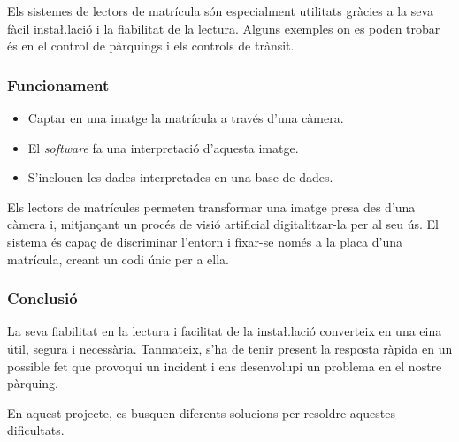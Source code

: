 Els sistemes de lectors de matrícula són
especialment utilitats gràcies a la seva fàcil insta\l.lació i la fiabilitat de
la lectura. Alguns exemples on es poden trobar és en el control de pàrquings i
els controls de trànsit.

\subsubsection{Funcionament}

\begin{itemize}
    \item Captar en una imatge la matrícula a través d'una càmera.
    \item El \emph{software} fa una interpretació d'aquesta imatge.
    \item S'inclouen les dades interpretades en una base de dades.
\end{itemize}

Els lectors de matrícules permeten transformar una imatge presa
des d'una càmera i, mitjançant un procés de visió artificial
digitalitzar-la per al seu ús. El sistema és capaç de discriminar l'entorn i
fixar-se només a la placa d'una matrícula, creant un codi únic
per a ella.

\subsubsection{Conclusió}

La seva fiabilitat en la lectura i facilitat de la insta\l.lació
converteix en una eina útil, segura i necessària. Tanmateix, s'ha de tenir present
la resposta ràpida en un possible fet que provoqui un incident i ens desenvolupi un
problema en el nostre pàrquing.

En aquest projecte, es busquen diferents solucions per resoldre aquestes
dificultats.